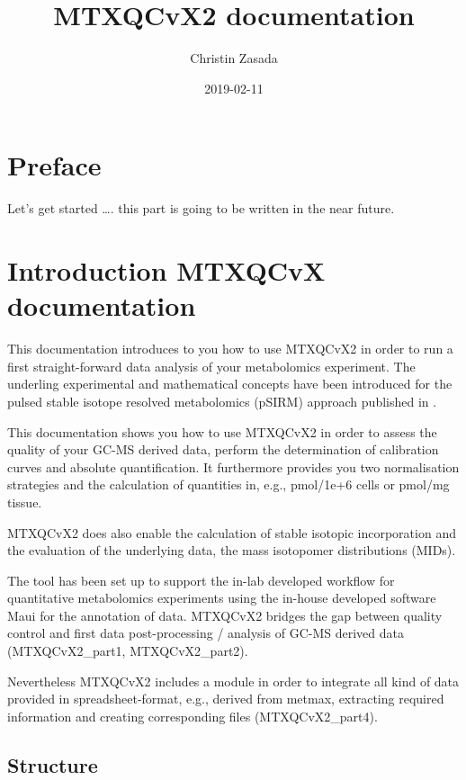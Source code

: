 \documentclass[]{book}
\title{MTXQCvX2 documentation}
\author{Christin Zasada}
\date{2019-02-11}
\theoremstyle{definition}
\theoremstyle{definition}
\theoremstyle{definition}
\theoremstyle{remark}
\begin{document}
\maketitle

{
\setcounter{tocdepth}{1}
\tableofcontents
}
\chapter{Preface}\label{preface}

Let's get started \ldots{}. this part is going to be written in the near
future.

\chapter{Introduction MTXQCvX documentation}\label{intro}

This documentation introduces to you how to use MTXQCvX2 in order to run
a first straight-forward data analysis of your metabolomics experiment.
The underling experimental and mathematical concepts have been
introduced for the pulsed stable isotope resolved metabolomics (pSIRM)
approach published in \citep{Pietzke2014}.

This documentation shows you how to use MTXQCvX2 in order to assess the
quality of your GC-MS derived data, perform the determination of
calibration curves and absolute quantification. It furthermore provides
you two normalisation strategies and the calculation of quantities in,
e.g., pmol/1e+6 cells or pmol/mg tissue.

MTXQCvX2 does also enable the calculation of stable isotopic
incorporation and the evaluation of the underlying data, the mass
isotopomer distributions (MIDs).

The tool has been set up to support the in-lab developed workflow for
quantitative metabolomics experiments using the in-house developed
software Maui for the annotation of data. MTXQCvX2 bridges the gap
between quality control and first data post-processing / analysis of
GC-MS derived data (MTXQCvX2\_part1, MTXQCvX2\_part2).

Nevertheless MTXQCvX2 includes a module in order to integrate all kind
of data provided in spreadsheet-format, e.g., derived from metmax,
extracting required information and creating corresponding files
(MTXQCvX2\_part4).

\section{Structure}\label{structure}
\end{document}
